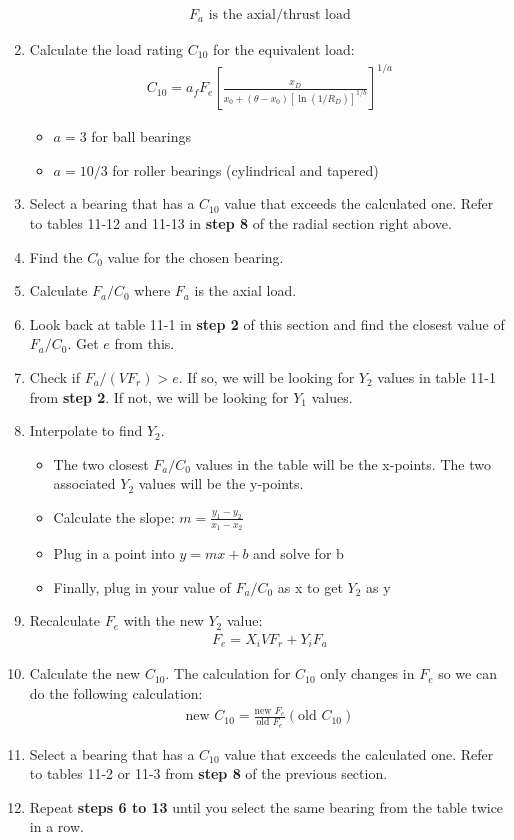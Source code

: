 \documentclass[11pt, fleqn]{article}
\begin{document}
\begin{enumerate}
\begin{align*}
        \text{$F_a$ is the axial/thrust load}
    \end{align*}
    \item Calculate the load rating $C_{10}$ for the equivalent load:
    \begin{align*}
        C_{10} = a_f F_e \left[ \frac{x_D}{x_0+(\theta - x_0)[\ln{(1/R_D)}]^{1/b}} \right]^{1/a}
    \end{align*}
    \begin{itemize}
        \item $a = 3$ for ball bearings
        \item $a = 10/3$ for roller bearings (cylindrical and tapered)
    \end{itemize}
    \item Select a bearing that has a $C_{10}$ value that exceeds the calculated one. Refer to tables 11-12 and 11-13 in \textbf{step 8} of the radial section right above.
    \item Find the $C_0$ value for the chosen bearing.
    \item Calculate $F_a/C_0$ where $F_a$ is the axial load.
    \item Look back at table 11-1 in \textbf{step 2} of this section and find the closest value of $F_a/C_0$. Get $e$ from this.
    \item Check if $F_a/(VF_r) > e$. If so, we will be looking for $Y_2$ values in table 11-1 from \textbf{step 2}. If not, we will be looking for $Y_1$ values.
    \item Interpolate to find $Y_{2}$.
    \begin{itemize}
        \item The two closest $F_{a}/C_0$ values in the table will be the x-points. The two associated $Y_2$ values will be the y-points.
        \item Calculate the slope: $m=\frac{y_1-y_2}{x_1-x_2}$
        \item Plug in a point into $y=mx+b$ and solve for b
        \item Finally, plug in your value of $F_a/C_0$ as x to get $Y_2$ as y
    \end{itemize}
    \item Recalculate $F_e$ with the new $Y_2$ value:
    \begin{align*}
        F_e=X_iVF_r+Y_iF_a
    \end{align*}
    \item Calculate the new $C_{10}$. The calculation for $C_{10}$ only changes in $F_e$ so we can do the following calculation:
    \begin{align*}
        \text{new } C_{10} = \frac{\text{new } F_e}{\text{old } F_e}(\text{old } C_{10})
    \end{align*}
    \item Select a bearing that has a $C_{10}$ value that exceeds the calculated one. Refer to tables 11-2 or 11-3 from \textbf{step 8} of the previous section.
    \item Repeat \textbf{steps 6 to 13} until you select the same bearing from the table twice in a row.
\end{enumerate}
\end{document}
